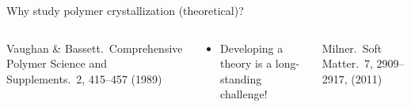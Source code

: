 \documentclass[aspectratio=169]{beamer}
\begin{document}
\begin{frame}[c]{Why study polymer crystallization (theoretical)?}
\begin{columns}[T]
    \vspace{0.5\baselineskip}
    {\scriptsize Vaughan \& Bassett.\ Comprehensive Polymer Science and Supplements.~2, 415--457 (1989)\par}


    \centering
    \begin{block}{}
      \begin{itemize}
        \item Developing a theory is a long-standing challenge!
      \end{itemize}
    \end{block}

    \vspace{0.5\baselineskip}
    {\scriptsize Milner.~Soft Matter.~7, 2909--2917, (2011)\par}

  \end{columns}

\end{frame}
\end{document}
